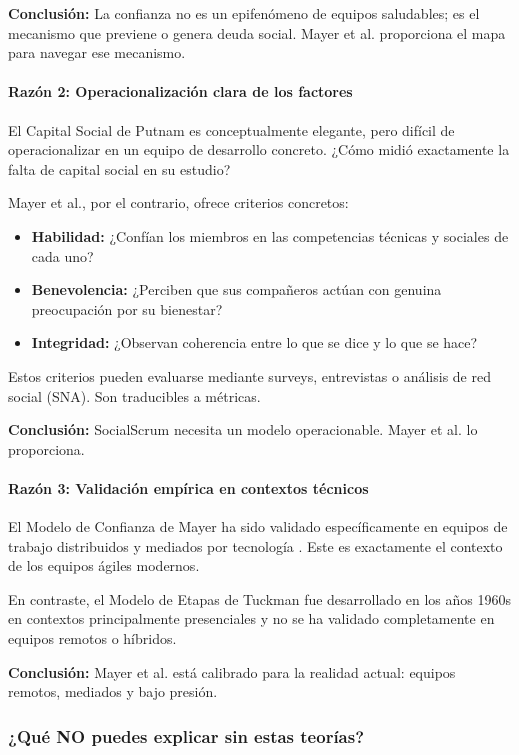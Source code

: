 \textbf{Conclusión:} La confianza no es un epifenómeno de equipos saludables; es el mecanismo que previene o genera deuda social. Mayer et al. proporciona el mapa para navegar ese mecanismo.

\paragraph{Razón 2: Operacionalización clara de los factores}

El Capital Social de Putnam es conceptualmente elegante, pero difícil de operacionalizar en un equipo de desarrollo concreto. ¿Cómo midió exactamente la falta de capital social en su estudio?

Mayer et al., por el contrario, ofrece criterios concretos:
\begin{itemize}
\item \textbf{Habilidad:} ¿Confían los miembros en las competencias técnicas y sociales de cada uno?
\item \textbf{Benevolencia:} ¿Perciben que sus compañeros actúan con genuina preocupación por su bienestar?
\item \textbf{Integridad:} ¿Observan coherencia entre lo que se dice y lo que se hace?
\end{itemize}

Estos criterios pueden evaluarse mediante surveys, entrevistas o análisis de red social (SNA). Son traducibles a métricas.

\textbf{Conclusión:} SocialScrum necesita un modelo operacionable. Mayer et al. lo proporciona.

\paragraph{Razón 3: Validación empírica en contextos técnicos}

El Modelo de Confianza de Mayer ha sido validado específicamente en equipos de trabajo distribuidos y mediados por tecnología \cite{wilson_all_2006, mayer_integrative_1995}. Este es exactamente el contexto de los equipos ágiles modernos.

En contraste, el Modelo de Etapas de Tuckman fue desarrollado en los años 1960s en contextos principalmente presenciales y no se ha validado completamente en equipos remotos o híbridos.

\textbf{Conclusión:} Mayer et al. está calibrado para la realidad actual: equipos remotos, mediados y bajo presión.

\subsubsection{¿Qué NO puedes explicar sin estas teorías?}

